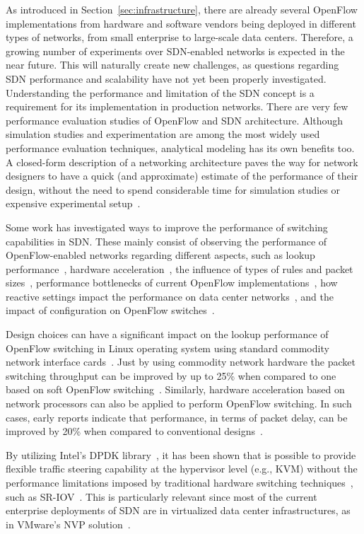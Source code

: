 As introduced in Section~\ref{sec:infrastructure}, there are already several OpenFlow implementations from 
hardware and software vendors being deployed in different types of networks, from small enterprise 
to large-scale data centers. Therefore, a growing number of experiments over SDN-enabled networks is expected 
in the near future. This will naturally create new challenges, as questions regarding SDN performance and 
scalability have not yet been properly investigated. Understanding the performance and limitation of the SDN 
concept is a requirement for its implementation in production networks. There are very few performance 
evaluation studies of OpenFlow and SDN architecture. Although simulation studies and experimentation are 
among the most widely used performance evaluation techniques, analytical modeling has its own benefits too. 
A closed-form description of a networking architecture paves the way for network designers to have a quick 
(and approximate) estimate of the performance of their design, without the need to spend considerable time 
for simulation studies or expensive experimental setup~\cite{Kobayashi2014151}.

Some work has investigated ways to improve the performance of switching capabilities in SDN.
These mainly consist of observing the performance of OpenFlow-enabled networks regarding different aspects, such as lookup 
performance~\cite{jarschel2011}, hardware acceleration~\cite{luo2009}, the influence of types of rules and 
packet sizes~\cite{bianco2010}, performance bottlenecks of current OpenFlow implementations~\cite{curtis2011}, 
how reactive settings impact the performance on data center networks~\cite{pries2012}, and the impact of
configuration on OpenFlow switches~\cite{sherwood2011}.

Design choices can have a significant impact on the lookup performance of OpenFlow switching in Linux 
operating system using standard commodity network interface cards~\cite{jarschel2011}. Just by using commodity 
network hardware the packet switching throughput can be improved by up to 25\% when compared to one based 
on soft OpenFlow switching~\cite{jarschel2011}. Similarly, hardware acceleration based on network processors 
can also be applied to perform OpenFlow switching. In such cases, early reports indicate that performance, 
in terms of packet delay, can be improved by 20\% when compared to conventional designs~\cite{luo2009}.

By utilizing Intel's DPDK library~\cite{intelcorporation2014}, it has been shown that is possible to provide 
flexible traffic steering capability at the hypervisor level (e.g., KVM) without the performance limitations 
imposed by traditional hardware switching techniques~\cite{hwang2014}, such as SR-IOV~\cite{dong2008}.
This is particularly relevant since most of the current enterprise deployments of SDN are in virtualized data 
center infrastructures, as in VMware's NVP solution~\cite{koponen}.

